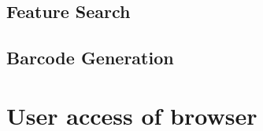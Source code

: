 \documentclass[12pt]{article}
\begin{document}
\subsection{Feature Search}



\subsection{Barcode Generation}


\section{User access of browser}
\end{document}
